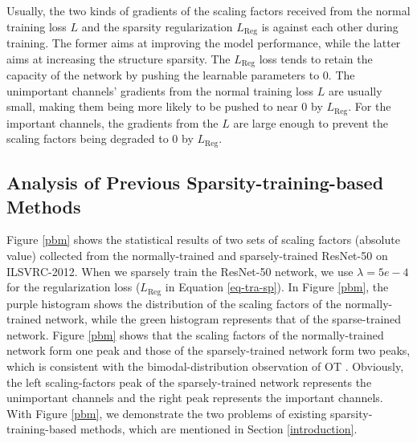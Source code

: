 \documentclass[review]{cvpr}
\begin{document}
Usually, the two kinds of gradients of the scaling factors received from the normal training loss $L$ and the sparsity regularization $L_\text{Reg}$ is against each other during training. The former aims at improving the model performance, while the latter aims at increasing the structure sparsity. The $L_\text{Reg}$ loss tends to retain the capacity of the network by pushing the learnable parameters to 0. The unimportant channels' gradients from the normal training loss $L$ are usually small, making them being more likely to be pushed to near 0 by $L_\text{Reg}$. For the important channels, the gradients from the $L$ are large enough to prevent the scaling factors being degraded to 0 by $L_\text{Reg}$. 

 
\subsection{ Analysis of Previous Sparsity-training-based Methods }\label{Analysisoftraditionalsp}

Figure \ref{pbm} shows the statistical results of two sets of scaling factors (absolute value) collected from the normally-trained and sparsely-trained ResNet-50 \cite{he2016deep} on ILSVRC-2012. When we sparsely train the ResNet-50 network, we use $\lambda=5e-4$ for the regularization loss ($L_\text{Reg}$ in Equation \ref{eq-tra-sp}). In Figure \ref{pbm}, the purple histogram shows the distribution of the scaling factors of the normally-trained network, while the green histogram represents that of the sparse-trained network. Figure \ref{pbm} shows that the scaling factors of the normally-trained network form one peak and those of the sparsely-trained network form two peaks, which is consistent with the bimodal-distribution observation of OT \cite{ye2020channel}.
Obviously, the left scaling-factors peak of the sparsely-trained network represents the unimportant channels and the right peak represents the important channels. 
With Figure \ref{pbm}, we demonstrate the two problems of existing sparsity-training-based methods, which are mentioned in Section \ref{introduction}. 
\end{document}
